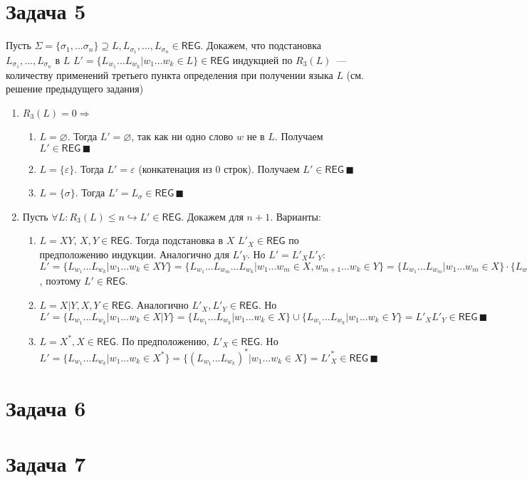 \documentclass[a4paper]{article}
\def\REG{{\mathsf{REG}}}
\begin{document}
\section*{Задача 5}
Пусть $\Sigma=\{\sigma_1,...\sigma_n\}\supseteq L,L_{\sigma_1},...,L_{\sigma_n}\in\REG$. Докажем, что подстановка $L_{\sigma_1},...,L_{\sigma_n}$ в $L$ $L'=\{L_{w_1}...L_{w_k}\big| w_1...w_k\in L\}\in\REG$ индукцией по $R_3(L)$~--- количеству применений третьего пункта определения при получении языка $L$ (см. решение предыдущего задания)\begin{enumerate}
\item $R_3(L)=0\Rightarrow$\begin{enumerate}
\item $L=\varnothing$. Тогда $L'=\varnothing$, так как ни одно слово $w$ не в $L$. Получаем $L'\in\REG\,\blacksquare$
\item $L=\{\varepsilon\}$. Тогда $L'=\varepsilon$ (конкатенация из $0$ строк). Получаем $L'\in\REG\,\blacksquare$
\item $L=\{\sigma\}$. Тогда $L'=L_\sigma\in\REG\,\blacksquare$
\end{enumerate}
\item Пусть $\forall L\colon R_3(L)\leqslant n\hookrightarrow L'\in\REG$. Докажем для $n+1$. Варианты:\begin{enumerate}
\item $L=XY$, $X,Y\in\REG$. Тогда подстановка в $X$ $L'_X\in\REG$ по предположению индукции. Аналогично для $L'_Y$. Но $L'=L'_XL'_Y$: $L'=\{L_{w_1}...L_{w_k}\big|w_1...w_k\in XY\}=\{L_{w_1}...L_{w_m}...L_{w_k}\big|w_1...w_m\in X,w_{m+1}...w_k\in Y\}=\{L_{w_1}...L_{w_m}\big|w_1...w_m\in X\}\cdot \{L_{w_{m+1}}...L_{w_k}\big|w_{m+1}...w_k\in Y\}=L'_XL'_Y$, поэтому $L'\in\REG$.
\item $L=X|Y,X,Y\in\REG$. Аналогично $L'_X,L'_Y\in\REG$. Но $L'=\{L_{w_1}...L_{w_k}\big|w_1...w_k\in X|Y\}=\{L_{w_1}...L_{w_k}\big|w_1...w_k\in X\}\cup\{L_{w_1}...L_{w_k}\big|w_1...w_k\in Y\}=L'_XL'_Y\in\REG\,\blacksquare$
\item $L=X^*,X\in\REG$. По предположению, $L'_X\in\REG$. Но $L'=\{L_{w_1}...L_{w_k}\big|w_1...w_k\in X^*\}=\{(L_{w_1}...L_{w_k})^*\big|w_1...w_k\in X\}={L'}_X^*\in\REG\,\blacksquare$
\end{enumerate}
\end{enumerate}
\section*{Задача 6}
\section*{Задача 7}
\end{document}
